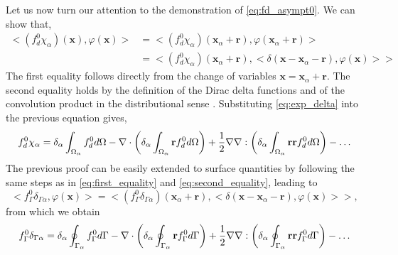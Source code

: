 Let us now turn our attention to the demonstration of \ref{eq:fd_asympt0}. 
We can show that, 
\begin{align}
    <(f_d^0\chi_\alpha)(\textbf{x}),\varphi(\textbf{x})>
    &= <(f_d^0\chi_\alpha)(\textbf{x}_\alpha+\textbf{r}),\varphi(\textbf{x}_\alpha+\textbf{r})> \label{eq:first_equality}\\
    &= 
    <(f_d^0\chi_\alpha)(\textbf{x}_\alpha + \textbf{r}) ,<\delta(\textbf{x} - \textbf{x}_\alpha - \textbf{r}), \varphi(\textbf{x})>>
    \label{eq:second_equality}
\end{align}
The first equality follows directly from the change of variables $\textbf{x}=\textbf{x}_\alpha + \textbf{r}$. 
The second equality holds by the definition of the Dirac delta functions and of the convolution product in the distributional sense \citep{appel2007}.
Substituting \ref{eq:exp_delta}  into the previous equation gives, 
\begin{equation}
    f^0_d \chi_\alpha
    = 
    \delta_\alpha
    \int_{\Omega_{\alpha}} 
        f^0_d
     d\Omega
    - \mathbf{\nabla}\cdot\left(    
    \delta_\alpha
    \int_{\Omega_{\alpha}} 
    \textbf{r}
    f^0_d d\Omega
    \right)
    + \frac{1}{2}\mathbf{\nabla}\mathbf{\nabla} :\left(\delta_\alpha\int_{\Omega_{\alpha}} \textbf{rr} f^0_d d\Omega\right)
    - \ldots
\end{equation}
The previous proof can be easily extended to surface quantities by following the same steps as in \ref{eq:first_equality} and \ref{eq:second_equality},  leading to
\begin{equation} 
    <f_\Gamma^0 \delta_{\Gamma\alpha},\varphi(\textbf{x})> = <(f_\Gamma^0 \delta_{\Gamma\alpha})(\textbf{x}_\alpha + \textbf{r}) ,<\delta(\textbf{x} - \textbf{x}_\alpha - \textbf{r}), \varphi(\textbf{x})>>,
\end{equation}
from which we obtain
\begin{equation} 
f_\Gamma^0 \delta_{\Gamma\alpha} 
=\delta_\alpha\oint_{\Gamma_{\alpha}} f^0_\Gamma d\Gamma
- \mathbf{\nabla}\cdot\left(\delta_\alpha\oint_{\Gamma_{\alpha}} \textbf{r} f^0_\Gamma d\Gamma\right)
+ \frac{1}{2}\mathbf{\nabla}\mathbf{\nabla} :\left(\delta_\alpha\oint_{\Gamma_{\alpha}} \textbf{rr} f^0_\Gamma d\Gamma\right)
-\ldots 
\end{equation}

